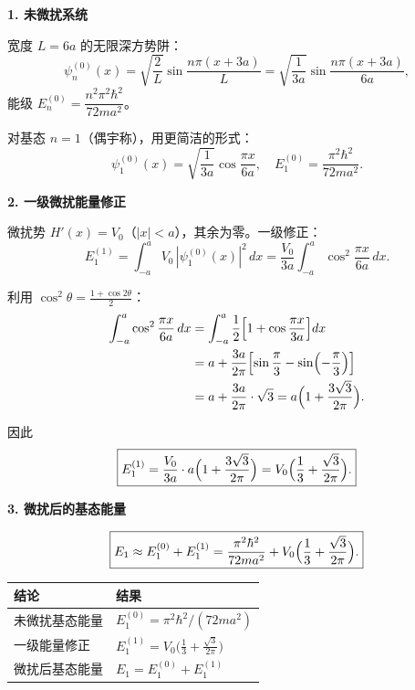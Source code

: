 \begin{derivationbox}[标准解题过程]
\textbf{1. 未微扰系统}

宽度 $L=6a$ 的无限深方势阱：
\[
\psi_n^{(0)}(x)=\sqrt{\frac{2}{L}}\sin\frac{n\pi(x+3a)}{L}=\sqrt{\frac{1}{3a}}\sin\frac{n\pi(x+3a)}{6a},
\]
能级 $E_n^{(0)}=\dfrac{n^2\pi^2\hbar^2}{72ma^2}$。

对基态 $n=1$（偶宇称），用更简洁的形式：
\[
\psi_1^{(0)}(x)=\sqrt{\frac{1}{3a}}\cos\frac{\pi x}{6a},\quad E_1^{(0)}=\frac{\pi^2\hbar^2}{72ma^2}.
\]

\textbf{2. 一级微扰能量修正}

微扰势 $H'(x)=V_0$（$|x|<a$），其余为零。一级修正：
\[
E_1^{(1)}=\int_{-a}^{a}V_0\,|\psi_1^{(0)}(x)|^2\,dx=\frac{V_0}{3a}\int_{-a}^{a}\cos^2\frac{\pi x}{6a}\,dx.
\]

利用 $\cos^2\theta=\frac{1+\cos2\theta}{2}$：
\begin{align*}
\int_{-a}^{a}\cos^2\frac{\pi x}{6a}\,dx&=\int_{-a}^{a}\frac12\Bigl[1+\cos\frac{\pi x}{3a}\Bigr]dx\\
&=a+\frac{3a}{2\pi}\Bigl[\sin\frac{\pi}{3}-\sin\Bigl(-\frac{\pi}{3}\Bigr)\Bigr]\\
&=a+\frac{3a}{2\pi}\cdot\sqrt3=a\Bigl(1+\frac{3\sqrt3}{2\pi}\Bigr).
\end{align*}

因此
\begin{equation}
\boxed{E_1^{(1)}=\frac{V_0}{3a}\cdot a\Bigl(1+\frac{3\sqrt3}{2\pi}\Bigr)=V_0\Bigl(\frac13+\frac{\sqrt3}{2\pi}\Bigr).}
\end{equation}

\textbf{3. 微扰后的基态能量}

\begin{equation}
\boxed{E_1\approx E_1^{(0)}+E_1^{(1)}=\frac{\pi^2\hbar^2}{72ma^2}+V_0\Bigl(\frac13+\frac{\sqrt3}{2\pi}\Bigr).}
\end{equation}
\end{derivationbox}

\begin{formulabox}[答案汇总]
\begin{center}
\begin{tabular}{ll}
\toprule
\textbf{结论} & \textbf{结果} \\
\midrule
未微扰基态能量 & $E_1^{(0)}=\pi^2\hbar^2/(72ma^2)$ \\
一级能量修正 & $E_1^{(1)}=V_0\bigl(\frac13+\frac{\sqrt3}{2\pi}\bigr)$ \\
微扰后基态能量 & $E_1=E_1^{(0)}+E_1^{(1)}$ \\
\bottomrule
\end{tabular}
\end{center}
\end{formulabox}

